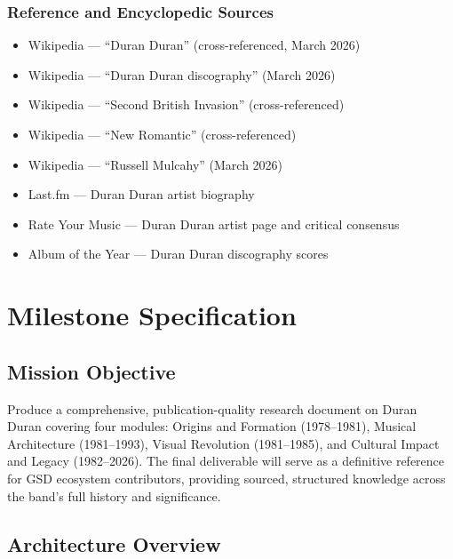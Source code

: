 \documentclass[11pt,letterpaper]{article}
\newcommand{\stageheader}[2]{%
  \noindent\colorbox{#2}{\makebox[\textwidth][l]{%
    \textcolor{white}{\bfseries\sffamily\hspace{6pt}#1\hspace{6pt}}}}%
  \vspace{0.5em}\par%
}
\begin{document}
\subsubsection{Reference and Encyclopedic Sources}
\begin{itemize}
  \item Wikipedia --- ``Duran Duran'' (cross-referenced, March 2026)
  \item Wikipedia --- ``Duran Duran discography'' (March 2026)
  \item Wikipedia --- ``Second British Invasion'' (cross-referenced)
  \item Wikipedia --- ``New Romantic'' (cross-referenced)
  \item Wikipedia --- ``Russell Mulcahy'' (March 2026)
  \item Last.fm --- Duran Duran artist biography
  \item Rate Your Music --- Duran Duran artist page and critical consensus
  \item Album of the Year --- Duran Duran discography scores
\end{itemize}

\newpage

\stageheader{STAGE 3 --- MISSION PACKAGE}{tertiary}

\section{Milestone Specification}

\subsection{Mission Objective}

Produce a comprehensive, publication-quality research document on Duran Duran covering four modules: Origins and Formation (1978--1981), Musical Architecture (1981--1993), Visual Revolution (1981--1985), and Cultural Impact and Legacy (1982--2026). The final deliverable will serve as a definitive reference for GSD ecosystem contributors, providing sourced, structured knowledge across the band's full history and significance.

\subsection{Architecture Overview}
\end{document}
